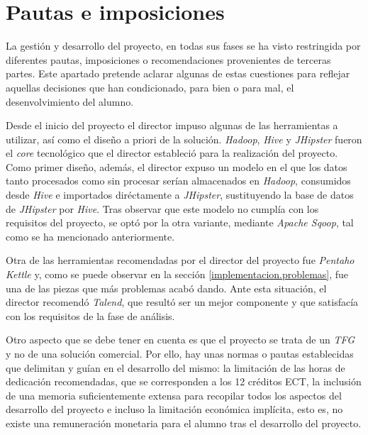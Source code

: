 \section{Pautas e imposiciones} \label{gestion.pautas}
La gestión y desarrollo del proyecto, en todas sus fases se ha visto restringida por diferentes pautas, imposiciones o recomendaciones provenientes de terceras partes. Este apartado pretende aclarar algunas de estas cuestiones para reflejar aquellas decisiones que han condicionado, para bien o para mal, el desenvolvimiento del alumno. 
\par Desde el inicio del proyecto el director impuso algunas de las herramientas a utilizar, así como el diseño a priori de la solución. \textit{Hadoop}, \textit{Hive} y \textit{JHipster} fueron el \textit{core} tecnológico que el director estableció para la realización del proyecto. Como primer diseño, además, el director expuso un modelo en el que los datos tanto procesados como sin procesar serían almacenados en \textit{Hadoop}, consumidos desde \textit{Hive} e importados diréctamente a \textit{JHipster}, sustituyendo la base de datos de \textit{JHipster} por \textit{Hive}. Tras observar que este modelo no cumplía con los requisitos del proyecto, se optó por la otra variante, mediante \textit{Apache Sqoop}, tal como se ha mencionado anteriormente. 
\par Otra de las herramientas recomendadas por el director del proyecto fue \textit{Pentaho Kettle} y, como se puede observar en la sección \ref{implementacion.problemas}, fue una de las piezas que más problemas acabó dando. Ante esta situación, el director recomendó \textit{Talend}, que resultó ser un mejor componente y que satisfacía con los requisitos de la fase de análisis.
\par Otro aspecto que se debe tener en cuenta es que el proyecto se trata de un \textit{TFG} y no de una solución comercial. Por ello, hay unas normas o pautas  establecidas que delimitan y guían en el desarrollo del mismo: la limitación de las horas de dedicación recomendadas, que se corresponden a los 12 créditos ECT, la inclusión de una memoria suficientemente extensa para recopilar todos los aspectos del desarrollo del proyecto e incluso la limitación económica implícita, esto es, no existe una remuneración monetaria para el alumno tras el desarrollo del proyecto. 

